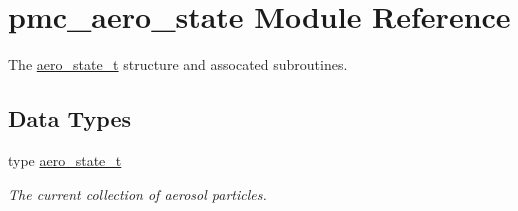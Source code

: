 \hypertarget{namespacepmc__aero__state}{}\section{pmc\+\_\+aero\+\_\+state Module Reference}
\label{namespacepmc__aero__state}


The \mbox{\hyperlink{structpmc__aero__state_1_1aero__state__t}{aero\+\_\+state\+\_\+t}} structure and assocated subroutines.  


\subsection*{Data Types}
\begin{DoxyCompactItemize}
\item 
type \mbox{\hyperlink{structpmc__aero__state_1_1aero__state__t}{aero\+\_\+state\+\_\+t}}
\begin{DoxyCompactList}\small\item\em The current collection of aerosol particles. \end{DoxyCompactList}\end{DoxyCompactItemize}
